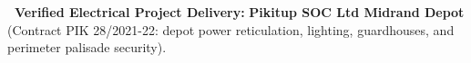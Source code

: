 \vfill

\noindent
\begin{tcolorbox}[enhanced, colback=white, colframe=mhnavy, boxrule=0.8pt, arc=3pt, left=8pt, right=8pt, top=6pt, bottom=6pt, drop shadow=black!3]
    {\fontsize{8pt}{10.6pt}\selectfont\color{mhnavy}\bfseries\faCheckCircle\ Verified Electrical Project Delivery:}\quad
    {\fontsize{8pt}{10.6pt}\selectfont\color{mhtext}
    \textbf{Pikitup SOC Ltd Midrand Depot} (Contract PIK 28/2021-22: depot power reticulation, lighting, guardhouses, and perimeter palisade security).
    }
\end{tcolorbox}

\clearpage
